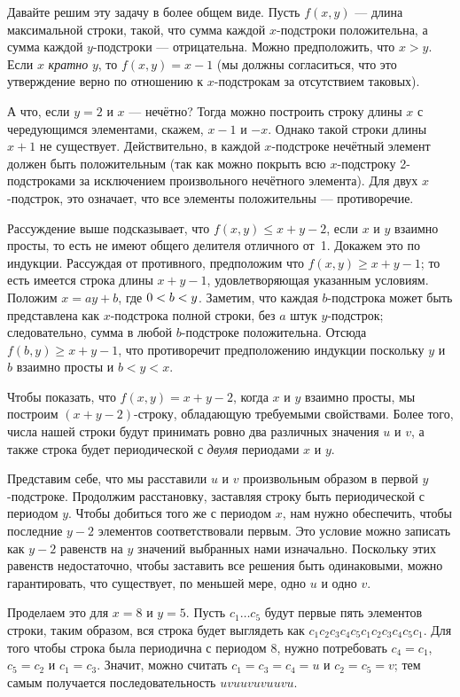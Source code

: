 Давайте решим эту задачу в более общем виде.
Пусть $f(x,y)$ --- длина максимальной строки, такой, что сумма каждой $x$-подстроки положительна, а сумма каждой $y$-подстроки --- отрицательна.
Можно предположить, что $x>y$.
Если $x$ \emph{кратно} $y$, то $f(x,y)=x-1$ (мы должны согласиться, что это утверждение верно по отношению к $x$-подстрокам за отсутствием таковых).

А что, если $y=2$ и $x$ --- нечётно?
Тогда можно построить строку длины $x$ с чередующимся элементами, скажем, $x-1$ и $-x$.
Однако такой строки длины $x+1$ не существует.
Действительно, в каждой $x$-подстроке нечётный элемент должен быть положительным 
(так как можно покрыть всю $x$-подстроку 2-подстроками за исключением произвольного нечётного элемента).
Для двух $x$-подстрок, это означает, что все элементы положительны ---
противоречие.

Рассуждение выше подсказывает, что $f(x,y)\le x+y-2$, если $x$ и $y$ взаимно просты, 
то есть не имеют общего делителя отличного от~1.
Докажем это по индукции.
Рассуждая от противного, предположим что $f(x,y)\ge x+y-1$;
то есть имеется строка длины $x+y-1$, удовлетворяющая указанным условиям.
Положим $x=ay+b$, где $0\z<b\z<y$.
Заметим, что каждая $b$-подстрока %
может быть представлена как $x$-подстрока полной строки, 
без $a$ штук $y$-подстрок; 
следовательно, сумма в любой $b$-подстроке положительна.
Отсюда
$f(b,y)\ge x+y-1$,
что противоречит предположению индукции поскольку $y$ и $b$ взаимно просты и $b<y<x$.

Чтобы показать, что $f(x,y)=x+y-2$, когда $x$ и $y$ взаимно просты, мы построим $(x+y-2)$-строку, обладающую требуемыми свойствами.
Более того, числа нашей строки будут принимать ровно два различных значения $u$ и $v$,
а также строка будет периодической с \emph{двумя} периодами $x$ и $y$.

Представим себе, что мы расставили $u$ и $v$ произвольным образом в первой $y$-подстроке.
Продолжим расстановку, заставляя строку быть периодической с периодом $y$.
Чтобы добиться того же с периодом $x$,
нам нужно обеспечить, чтобы последние $y-2$ элементов соответствовали первым.
Это условие можно записать как $y-2$ равенств на $y$ значений выбранных нами изначально.
Поскольку этих равенств недостаточно, чтобы заставить все решения быть одинаковыми, можно гарантировать, что существует, по меньшей мере, одно $u$ и одно $v$.

Проделаем это для $x=8$ и $y=5$.
Пусть $c_1\dots c_5$ будут первые пять элементов строки, 
таким образом, вся строка будет выглядеть как
$c_1c_2c_3c_4c_5c_1c_2c_3c_4c_5c_1$.
Для того чтобы строка была периодична с периодом 8, 
нужно потребовать $c_4=c_1$, $c_5=c_2$ и $c_1=c_3$.
Значит, можно считать $c_1=c_3=c_4=u$ и $c_2=c_5=v$; 
тем самым получается последовательность $uvuuvuvuuvu$.

